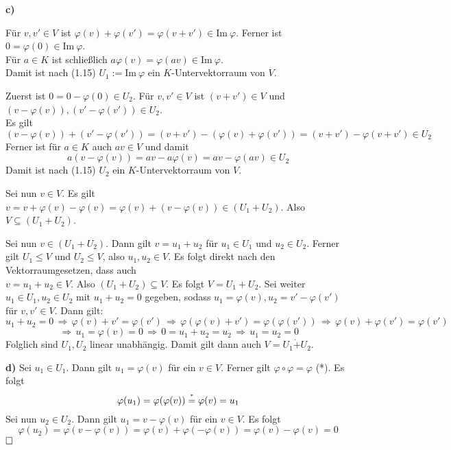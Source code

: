 \documentclass[a4paper,graphics,11pt]{article}
\newcommand{\up}[2]{\mathrel{\overset{\makebox[0pt]{\mbox{\normalfont\tiny #2}}}{#1}}}
\begin{document}
\textbf{c)}

Für $v, v' \in V$ ist $\varphi(v) + \varphi(v') = \varphi(v+v') \in \text{Im}\ \varphi$.
Ferner ist $0 = \varphi(0) \in \text{Im}\ \varphi$.\\
Für $a \in K$ ist schließlich $a\varphi(v) = \varphi(av) \in \text{Im}\ \varphi$.\\
Damit ist nach (1.15)
$U_1 := \text{Im}\ \varphi$ ein $K$-Untervektorraum von $V$.

\newpage

Zuerst ist $0 = 0 - \varphi(0) \in U_2$.
Für $v, v' \in V$ ist $(v+v') \in V$ und $(v - \varphi(v)), (v' -\varphi(v')) \in U_2$.\\
Es gilt
$$
    (v - \varphi(v)) + (v' - \varphi(v'))
    = (v + v') - (\varphi(v) + \varphi(v'))
    = (v+v') - \varphi(v+v') \in U_2
$$
Ferner ist für $a \in K$ auch $av \in V$ und damit
$$
    a(v - \varphi(v)) = av - a\varphi(v) = av - \varphi(av) \in U_2
$$
Damit ist nach (1.15) $U_2$ ein $K$-Untervektorraum von $V$.

Sei nun $v \in V$. Es gilt $v = v + \varphi(v) - \varphi(v) = \varphi(v) + (v - \varphi(v)) \in (U_1 + U_2)$.
Also $V \subseteq (U_1 + U_2)$.

Sei nun $v \in (U_1 + U_2)$. Dann gilt $v = u_1 + u_2$ für $u_1 \in U_1$ und $u_2 \in U_2$.
Ferner gilt $U_1 \leq V$ und $U_2 \leq V$, also $u_1, u_2 \in V$. Es folgt direkt nach den
Vektorraumgesetzen, dass auch\\
$v = u_1 + u_2 \in V$.
Also $(U_1 + U_2) \subseteq V$. Es folgt $V = U_1 + U_2$.
Sei weiter $u_1 \in U_1, u_2 \in U_2$ mit $u_1 + u_2 = 0$ gegeben, sodass
$u_1 = \varphi(v), u_2 = v' - \varphi(v')$ für $v,v' \in V$. Dann gilt:
$$
    u_1 + u_2 = 0
    \,\Longrightarrow\, \varphi(v) + v' = \varphi(v')
    \,\Longrightarrow\, \varphi(\varphi(v) + v') = \varphi(\varphi(v'))
    \,\Longrightarrow\, \varphi(v) + \varphi(v') = \varphi(v')
$$$$
    \,\Longrightarrow\, u_1 = \varphi(v) = 0
    \,\Longrightarrow\, 0 = u_1 + u_2 = u_2
    \,\Longrightarrow\, u_1 = u_2 = 0
$$
Folglich sind $U_1, U_2$ linear unabhängig. Damit gilt dann auch $V = U_1 \dot+ U_2$.


\textbf{d)}
Sei $u_1 \in U_1$. Dann gilt $u_1 = \varphi(v)$ für ein $v \in V$. Ferner gilt $\varphi \circ \varphi = \varphi$ (*).
Es folgt
$$
    \varphi(u_1)
    = \varphi(\varphi(v))
    \up{=}{*} \varphi(v)
    = u_1
$$
Sei nun $u_2 \in U_2$. Dann gilt $u_1 = v - \varphi(v)$ für ein $v \in V$. Es folgt
$$
    \varphi(u_2)
    = \varphi(v - \varphi(v))
    = \varphi(v) + \varphi(-\varphi(v))
    = \varphi(v) - \varphi(v)
    = 0
$$
$\strut\hfill\square$
\end{document}
